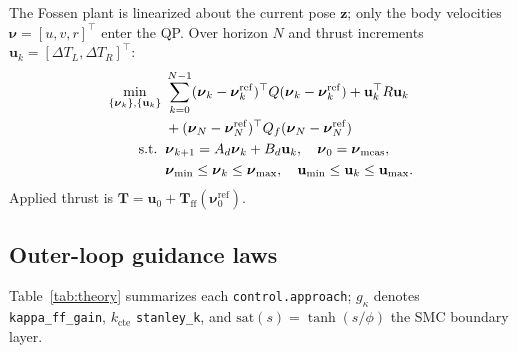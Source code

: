 \documentclass[11pt,a4paper]{article}
\begin{document}
The Fossen plant is linearized about the current pose $\mathbf{z}$; only the body velocities
$\boldsymbol{\nu}=[u,v,r]^\top$ enter the QP. Over horizon $N$ and thrust increments
$\mathbf{u}_k=[\Delta T_L,\Delta T_R]^\top$:
\begin{align}
  \min_{\{\boldsymbol{\nu}_k\},\{\mathbf{u}_k\}} \;
    & \sum_{k=0}^{N-1} (\boldsymbol{\nu}_k - \boldsymbol{\nu}_k^{\mathrm{ref}})^\top
      Q (\boldsymbol{\nu}_k - \boldsymbol{\nu}_k^{\mathrm{ref}})
      + \mathbf{u}_k^\top R \mathbf{u}_k \notag \\
    & + (\boldsymbol{\nu}_N - \boldsymbol{\nu}_N^{\mathrm{ref}})^\top Q_f
      (\boldsymbol{\nu}_N - \boldsymbol{\nu}_N^{\mathrm{ref}}) \notag \\
  \text{s.t.}\;\;
    & \boldsymbol{\nu}_{k+1} = A_d \boldsymbol{\nu}_k + B_d \mathbf{u}_k,
      \quad \boldsymbol{\nu}_0 = \boldsymbol{\nu}_{\mathrm{meas}}, \notag \\
    & \boldsymbol{\nu}_{\min} \le \boldsymbol{\nu}_k \le \boldsymbol{\nu}_{\max},
      \quad \mathbf{u}_{\min} \le \mathbf{u}_k \le \mathbf{u}_{\max}.
\end{align}
Applied thrust is $\mathbf{T} = \mathbf{u}_0 + \mathbf{T}_{\mathrm{ff}}(\boldsymbol{\nu}_0^{\mathrm{ref}})$.

\subsection{Outer-loop guidance laws}

Table~\ref{tab:theory} summarizes each \texttt{control.approach}; $g_\kappa$ denotes
\texttt{kappa\_ff\_gain}, $k_{\mathrm{cte}}$ \texttt{stanley\_k}, and
$\mathrm{sat}(s)=\tanh(s/\phi)$ the SMC boundary layer.
\end{document}
